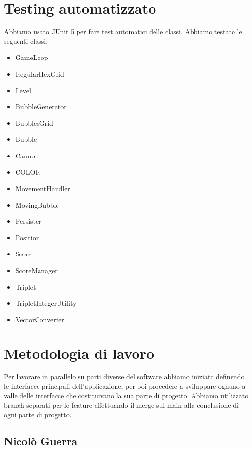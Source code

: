 \documentclass[a4paper,12pt]{report}
\begin{document}
\section{Testing automatizzato}

Abbiamo usato JUnit 5 per fare test automatici delle classi. 
Abbiamo testato le seguenti classi:
\begin{itemize}
	\item GameLoop
	\item RegularHexGrid
	\item Level
	\item BubbleGenerator
	\item BubblesGrid
	\item Bubble
	\item Cannon
	\item COLOR
	\item MovementHandler
	\item MovingBubble
	\item Persister
	\item Position
	\item Score
	\item ScoreManager
	\item Triplet
	\item TripletIntegerUtility
	\item VectorConverter

\end{itemize}

\section{Metodologia di lavoro}

Per lavorare in parallelo su parti diverse del software abbiamo iniziato definendo le interfacce principali dell'applicazione, per poi procedere a sviluppare ognuno a valle delle interfacce che costituivano la sua
parte di progetto. Abbiamo utilizzato branch separati per le feature effettuando il merge sul main alla conclusione di ogni parte di progetto.

\subsection{Nicolò Guerra}
\end{document}
